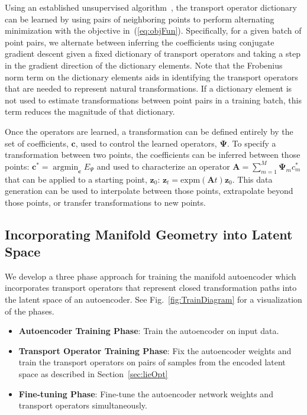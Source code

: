 \documentclass[letterpaper]{article} %
\newcommand{\mtx}[1]{\ensuremath{\mathbf{#1}}}
\newcommand{\vtr}[1]{\ensuremath{\mathbf{#1}}}
\newcommand{\argmin}{\mathop{\mathrm{argmin}}}
\begin{document}
Using an established unsupervised algorithm~\cite{culpepper2009learning}, the transport operator dictionary can be learned by using pairs of neighboring points to perform alternating minimization with the objective in~(\ref{eq:objFun}). Specifically, for a given batch of point pairs, we alternate between inferring the coefficients using conjugate gradient descent given a fixed dictionary of transport operators and taking a step in the gradient direction of the dictionary elements. Note that the Frobenius norm term on the dictionary elements aids in identifying the transport operators that are needed to represent natural transformations. If a dictionary element is not used to estimate transformations between point pairs in a training batch, this term reduces the magnitude of that dictionary.

Once the operators are learned, a transformation can be defined entirely by the set of coefficients, $\vtr{c}$, used to control the learned operators, $\mtx{\Psi}$. To specify a transformation between two points, the coefficients can be inferred between those points: $\vtr{c}^* =  \argmin_\vtr{c}E_{\Psi}$ and used to characterize an operator $\mtx{A} = \sum_{m=1}^M{\mtx{\Psi}_mc^*_{m}}$ that can be applied to a starting point, $\vtr{z}_0$: $\vtr{z}_t = \mathrm{expm}(\mtx{A}t)\vtr{z}_0$. This data generation can be used to interpolate between those points, extrapolate beyond those points, or transfer transformations to new points.

\subsection{Incorporating Manifold Geometry into Latent Space}\label{subsec:manigeo}
We develop a three phase approach for training the manifold autoencoder which incorporates transport operators that represent closed transformation paths into the latent space of an autoencoder. See Fig.~\ref{fig:TrainDiagram} for a visualization of the phases.
\begin{itemize}
\item \textbf{Autoencoder Training Phase}: Train the autoencoder on input data.
\item \textbf{Transport Operator Training Phase}: Fix the autoencoder weights and train the transport operators on pairs of samples from the encoded latent space as described in Section~\ref{sec:lieOpt}
\item \textbf{Fine-tuning Phase}: Fine-tune the autoencoder network weights and transport operators simultaneously.
\end{itemize}
\end{document}
